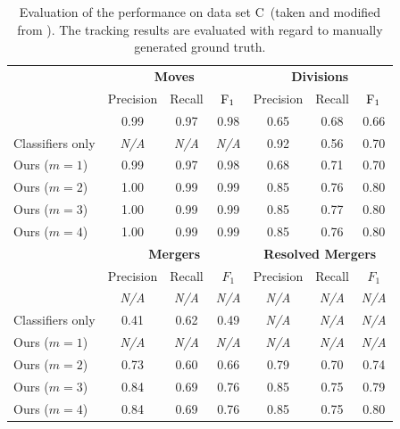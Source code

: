 \begin{table} %
    \begin{tabular}{l||ccc|ccc}
        \toprule
        & \multicolumn{3}{c|}{\textbf{Moves}} & \multicolumn{3}{c}{\textbf{Divisions}} \\
        & Precision& Recall& $\operatorname{F}_{1}$ & Precision& Recall& $\operatorname{F}_{1}$ \\ \hline
        \citep{kausler_12_discrete} & 0.99 & 0.97 & 0.98 & 0.65 & 0.68 & 0.66 \\
        Classifiers only & \textit{N/A} & \textit{N/A} & \textit{N/A} & 0.92 & 0.56 & 0.70 \\
        Ours ($m=1$) & 0.99 & 0.97 & 0.98 & 0.68 & 0.71 & 0.70 \\
        Ours ($m=2$) & 1.00 & 0.99 & 0.99 & 0.85 & 0.76 & 0.80 \\
        Ours ($m=3$) & 1.00 & 0.99 & 0.99 & 0.85 & 0.77 & 0.80 \\
        Ours ($m=4$) & 1.00 & 0.99 & 0.99 & 0.85 & 0.76 & 0.80 \\
        \midrule & \multicolumn{3}{c|}{\textbf{Mergers} } & \multicolumn{3}{c}{\textbf{Resolved Mergers}} \\ 
        & Precision& Recall& $F_{1}$ & Precision& Recall& $F_{1}$ \\ \hline
        \citet{kausler_12_discrete} & \textit{N/A}& \textit{N/A} & \textit{N/A} & \textit{N/A}&
        \textit{N/A} & \textit{N/A} \\
        Classifiers only & 0.41 & 0.62 & 0.49 & \textit{N/A}& \textit{N/A} & \textit{N/A} \\
        Ours ($m=1$) & \textit{N/A}& \textit{N/A} & \textit{N/A} & \textit{N/A}& \textit{N/A} & \textit{N/A}\\ 
        Ours ($m=2$) & 0.73 & 0.60 & 0.66 & 0.79 & 0.70 & 0.74\\
        Ours ($m=3$) & 0.84 & 0.69 & 0.76 & 0.85 & 0.75 & 0.79\\
        Ours ($m=4$) & 0.84 & 0.69 & 0.76 & 0.85 & 0.75 & 0.80\\
        \bottomrule
    \end{tabular}
    \caption[Conservation tracking results: Data Set C]{Evaluation of the performance on data set
C~(taken and modified from \citealp[Table~2]{schiegg_13_conservation}). The tracking results are
evaluated with regard to manually generated ground truth.}
    \label{tab:gmm-result-c}
\end{table}


